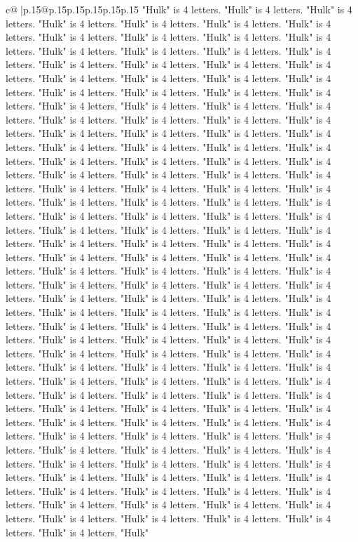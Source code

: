 \documentclass{article}
\begin{document}
{\begin{supertabular}{c@{$\;$}|p{.15\linewidth}@{}p{.15\linewidth}p{.15\linewidth}p{.15\linewidth}p{.15\linewidth}p{.15\linewidth}}
{{{"Hulk" is 4 letters. "Hulk" is 4 letters. "Hulk" is 4 letters. "Hulk" is 4 letters. "Hulk" is 4 letters. "Hulk" is 4 letters. "Hulk" is 4 letters. "Hulk" is 4 letters. "Hulk" is 4 letters. "Hulk" is 4 letters. "Hulk" is 4 letters. "Hulk" is 4 letters. "Hulk" is 4 letters. "Hulk" is 4 letters. "Hulk" is 4 letters. "Hulk" is 4 letters. "Hulk" is 4 letters. "Hulk" is 4 letters. "Hulk" is 4 letters. "Hulk" is 4 letters. "Hulk" is 4 letters. "Hulk" is 4 letters. "Hulk" is 4 letters. "Hulk" is 4 letters. "Hulk" is 4 letters. "Hulk" is 4 letters. "Hulk" is 4 letters. "Hulk" is 4 letters. "Hulk" is 4 letters. "Hulk" is 4 letters. "Hulk" is 4 letters. "Hulk" is 4 letters. "Hulk" is 4 letters. "Hulk" is 4 letters. "Hulk" is 4 letters. "Hulk" is 4 letters. "Hulk" is 4 letters. "Hulk" is 4 letters. "Hulk" is 4 letters. "Hulk" is 4 letters. "Hulk" is 4 letters. "Hulk" is 4 letters. "Hulk" is 4 letters. "Hulk" is 4 letters. "Hulk" is 4 letters. "Hulk" is 4 letters. "Hulk" is 4 letters. "Hulk" is 4 letters. "Hulk" is 4 letters. "Hulk" is 4 letters. "Hulk" is 4 letters. "Hulk" is 4 letters. "Hulk" is 4 letters. "Hulk" is 4 letters. "Hulk" is 4 letters. "Hulk" is 4 letters. "Hulk" is 4 letters. "Hulk" is 4 letters. "Hulk" is 4 letters. "Hulk" is 4 letters. "Hulk" is 4 letters. "Hulk" is 4 letters. "Hulk" is 4 letters. "Hulk" is 4 letters. "Hulk" is 4 letters. "Hulk" is 4 letters. "Hulk" is 4 letters. "Hulk" is 4 letters. "Hulk" is 4 letters. "Hulk" is 4 letters. "Hulk" is 4 letters. "Hulk" is 4 letters. "Hulk" is 4 letters. "Hulk" is 4 letters. "Hulk" is 4 letters. "Hulk" is 4 letters. "Hulk" is 4 letters. "Hulk" is 4 letters. "Hulk" is 4 letters. "Hulk" is 4 letters. "Hulk" is 4 letters. "Hulk" is 4 letters. "Hulk" is 4 letters. "Hulk" is 4 letters. "Hulk" is 4 letters. "Hulk" is 4 letters. "Hulk" is 4 letters. "Hulk" is 4 letters. "Hulk" is 4 letters. "Hulk" is 4 letters. "Hulk" is 4 letters. "Hulk" is 4 letters. "Hulk" is 4 letters. "Hulk" is 4 letters. "Hulk" is 4 letters. "Hulk" is 4 letters. "Hulk" is 4 letters. "Hulk" is 4 letters. "Hulk" is 4 letters. "Hulk" is 4 letters. "Hulk" is 4 letters. "Hulk" is 4 letters. "Hulk" is 4 letters. "Hulk" is 4 letters. "Hulk" is 4 letters. "Hulk" is 4 letters. "Hulk" is 4 letters. "Hulk" is 4 letters. "Hulk" is 4 letters. "Hulk" is 4 letters. "Hulk" is 4 letters. "Hulk" is 4 letters. "Hulk" is 4 letters. "Hulk" is 4 letters. "Hulk" is 4 letters. "Hulk" is 4 letters. "Hulk" is 4 letters. "Hulk" is 4 letters. "Hulk" is 4 letters. "Hulk" is 4 letters. "Hulk" is 4 letters. "Hulk" is 4 letters. "Hulk" is 4 letters. "Hulk" is 4 letters. "Hulk" is 4 letters. "Hulk" is 4 letters. "Hulk" is 4 letters. "Hulk" is 4 letters. "Hulk" is 4 letters. "Hulk" is 4 letters. "Hulk" is 4 letters. "Hulk" is 4 letters. "Hulk" is 4 letters. "Hulk" is 4 letters. "Hulk" is 4 letters. "Hulk" is 4 letters. "Hulk" is 4 letters. "Hulk" is 4 letters. "Hulk" is 4 letters. "Hulk" is 4 letters. "Hulk" is 4 letters. "Hulk" is 4 letters. "Hulk" is 4 letters. "Hulk" is 4 letters. "Hulk" is 4 letters. "Hulk" is 4 letters. "Hulk" is 4 letters. "Hulk" is 4 letters. "Hulk" is 4 letters. "Hulk" is 4 letters. "Hulk" is 4 letters. "Hulk" is 4 letters. "Hulk" }}}
\end{supertabular}}
\end{document}
